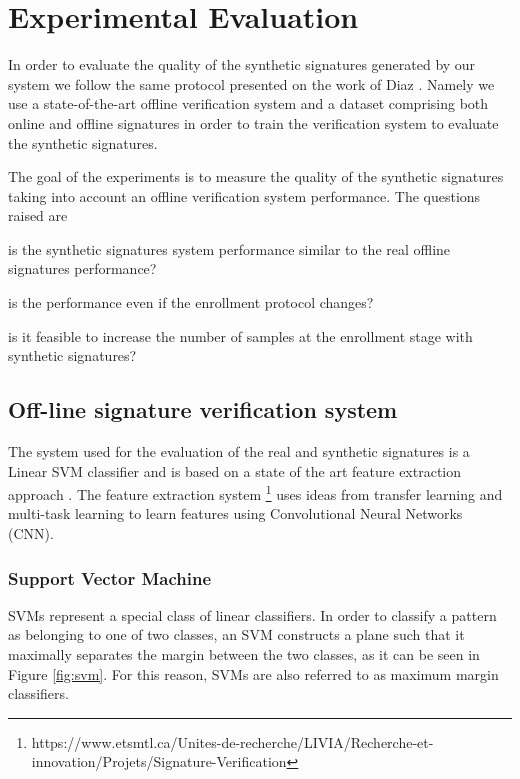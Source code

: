 
\chapter{Experimental Evaluation}\label{ch:exp}

In order to evaluate the quality of the synthetic signatures generated by our system we follow the same protocol presented on the work of Diaz \cite{diaz2014generation}. Namely we use a state-of-the-art offline verification system and a dataset comprising both online and offline signatures in order to train the verification system to evaluate the synthetic signatures.

The goal of the experiments is to measure the quality of the synthetic signatures taking into account an offline verification system performance. The questions raised are \begin{inlinelist}
  \item is the synthetic signatures system performance similar to the real offline signatures performance?
  \item is the performance even if the enrollment protocol changes?
  \item is it feasible to increase the number of samples at the enrollment stage with synthetic signatures? 
\end{inlinelist}



\section{Off-line signature verification system}
The system used for the evaluation of the real and synthetic signatures is a Linear SVM classifier and is based on a state of the art feature extraction approach  \cite{hafemann2017learning}. The feature extraction system \footnote{https://www.etsmtl.ca/Unites-de-recherche/LIVIA/Recherche-et-innovation/Projets/Signature-Verification} uses ideas from transfer learning and multi-task learning to learn features using Convolutional Neural Networks (CNN).

\subsection {Support Vector Machine} 
SVMs represent a special class of linear classifiers. In order to classify a pattern as
belonging to one of two classes, an SVM constructs a plane such that it maximally separates the margin between the two classes, as it can be seen in Figure \ref{fig:svm}. For this reason, SVMs are also referred to as maximum margin classifiers.

